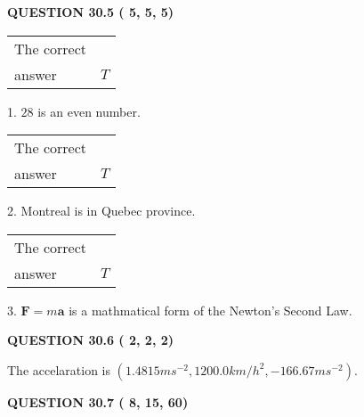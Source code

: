 \documentclass[12pt]{article}
\begin{document}
 
 
  
\vspace{0.2in}
  
{\textbf{\Large{QUESTION
30.5 
 (          5,          5,          5)
}}}
  
  
 
 
\noindent{}

 
\noindent\begin{tabular}{|l|l|}\hline The correct & \\
          answer &  %
$T$ \\ \hline \end{tabular}
1. $ %
28$ is an  %
even number.
 
\noindent\begin{tabular}{|l|l|}\hline The correct & \\
          answer &  %
$T$ \\ \hline \end{tabular}
2.  %
Montreal is in  %
Quebec province.
 
\noindent\begin{tabular}{|l|l|}\hline The correct & \\
          answer &  %
$T$ \\ \hline \end{tabular}
3.  %
$\mathbf{F}=m\mathbf{a}$ is a mathmatical form of  %
the Newton's Second Law.
 
 
 
  
\vspace{0.2in}
  
{\textbf{\Large{QUESTION
30.6 
 (          2,          2,          2)
}}}
  
  
 
 
\noindent{}
 
 
The accelaration is
$(
1.4815ms^{-2},
1200.0km/h^2,
-166.67ms^{-2}
).
$
 
 
 
 
  
\vspace{0.2in}
  
{\textbf{\Large{QUESTION
30.7 
 (          8,         15,         60)
}}}
  
  
 
 
\noindent{}
\end{document}
